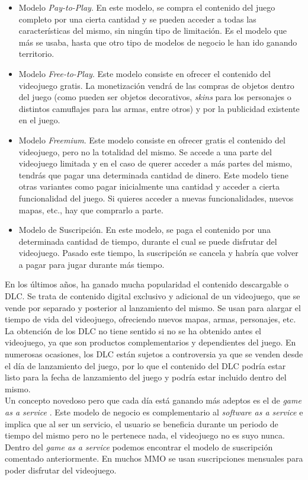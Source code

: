 \begin{itemize}
\item Modelo \textit{Pay-to-Play}. En este modelo, se compra el contenido del juego completo por una cierta cantidad y se pueden acceder a todas las características del mismo, sin ningún tipo de limitación. Es el modelo que más se usaba, hasta que otro tipo de modelos de negocio le han ido ganando territorio.
\item Modelo \textit{Free-to-Play}. Este modelo consiste en ofrecer el contenido del videojuego gratis. La monetización vendrá de las compras de objetos dentro del juego (como pueden ser objetos decorativos, \textit{skins} para los personajes o distintos camuflajes para las armas, entre otros) y por la publicidad existente en el juego.
\item Modelo \textit{Freemium}. Este modelo consiste en ofrecer gratis el contenido del videojuego, pero no la totalidad del mismo. Se accede a una parte del videojuego limitada y en el caso de querer acceder a más partes del mismo, tendrás que pagar una determinada cantidad de dinero. Este modelo tiene otras variantes como pagar inicialmente una cantidad y acceder a cierta funcionalidad del juego. Si quieres acceder a nuevas funcionalidades, nuevos mapas, etc., hay que comprarlo a parte.
\item Modelo de Suscripción. En este modelo, se paga el contenido por una determinada cantidad de tiempo, durante el cual se puede disfrutar del videojuego. Pasado este tiempo, la suscripción se cancela y habría que volver a pagar para jugar durante más tiempo.
\end{itemize}

En los últimos años, ha ganado mucha popularidad el contenido descargable o \ac{DLC}. Se trata de contenido digital exclusivo y adicional de un videojuego, que se vende por separado y posterior al lanzamiento del mismo. Se usan para alargar el tiempo de vida del videojuego, ofreciendo nuevos mapas, armas, personajes, etc. La obtención de los \ac{DLC} no tiene sentido si no se ha obtenido antes el videojuego, ya que son productos complementarios y dependientes del juego. En numerosas ocasiones, los \ac{DLC} están sujetos a controversia ya que se venden desde el día de lanzamiento del juego, por lo que el contenido del \ac{DLC} podría estar listo para la fecha de lanzamiento del juego y podría estar incluido dentro del mismo.\\


Un concepto novedoso pero que cada día está ganando más adeptos es el de \textit{game as a service} \cite{11}. Este modelo de negocio es complementario al \textit{software as a service} e implica que al ser un servicio, el usuario se beneficia durante un periodo de tiempo del mismo pero no le pertenece nada, el videojuego no es suyo nunca. Dentro del \textit{game as a service} podemos encontrar el modelo de suscripción comentado anteriormente. En muchos \ac{MMO} se usan suscripciones mensuales para poder disfrutar del videojuego.\\


